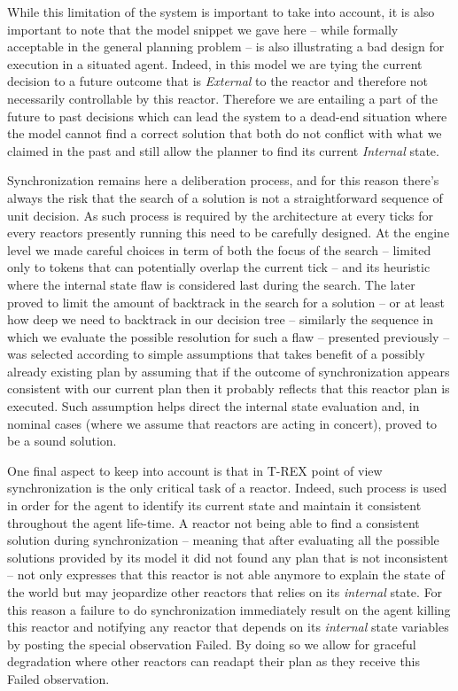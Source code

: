 While this limitation of the system is important to take into account,
it is also important to note that the model snippet we gave here --
while formally acceptable in the general planning problem -- is also
illustrating a bad design for execution in a situated agent. Indeed,
in this model we are tying the current decision to a future outcome
that is {\em External} to the reactor and therefore not necessarily
controllable by this reactor. Therefore we are entailing a part of the
future to past decisions which can lead the system to a dead-end
situation where the model cannot find a correct solution that both do
not conflict with what we claimed in the past and still allow the
planner to find its current {\em Internal} state.

Synchronization remains here a deliberation process, and for this
reason there's always the risk that the search of a solution is not a
straightforward sequence of unit decision. As such process is required
by the architecture at every ticks for every reactors presently
running this need to be carefully designed. At the engine level we
made careful choices in term of both the focus of the search -- limited
only to tokens that can potentially overlap the current tick -- and
its heuristic where the internal state flaw is considered last during
the search. The later proved to limit the amount of backtrack in the
search for a solution -- or at least how deep we need to backtrack in
our decision tree -- similarly the sequence in which we evaluate the
possible resolution for such a flaw -- presented previously -- was
selected according to simple assumptions that takes benefit of a
possibly already existing plan by assuming that if the outcome of
synchronization appears consistent with our current plan then it
probably reflects that this reactor plan is executed. Such assumption
helps direct the internal state evaluation and, in nominal cases (where
we assume that reactors are acting in concert), proved to be a sound
solution.  

One final aspect to keep into account is that in T-REX point of view
synchronization is the only critical task of a reactor. Indeed, such
process is used in order for the agent to identify its
current state and maintain it consistent throughout the agent
life-time. A reactor not being able to find a consistent solution
during synchronization -- meaning that after evaluating all the
possible solutions provided by its model it did not found any plan
that is not inconsistent -- not only expresses that this reactor is
not able anymore to explain the state of the world but may jeopardize
other reactors that relies on its {\em internal} state. For this
reason a failure to do synchronization immediately result on the
agent killing this reactor and notifying any reactor that depends on
its {\em internal} state variables by posting the special observation
\textsf{Failed}. By doing so we allow for graceful degradation where
other reactors can readapt their plan as they receive this
\textsf{Failed} observation.

